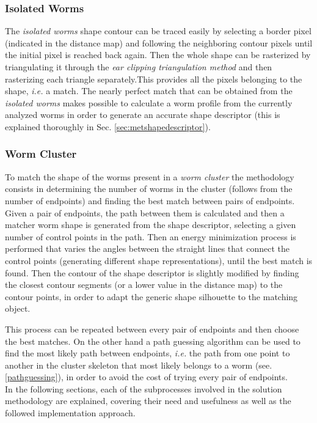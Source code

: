 \subsubsection*{Isolated Worms}
The \emph{isolated worms} shape contour can be traced easily by selecting a border pixel
(indicated in the distance map) and following the neighboring contour pixels until the
initial pixel is reached back again. Then the whole shape can be rasterized by 
triangulating it through the \emph{ear clipping triangulation method} and then rasterizing
each triangle separately.This provides all the pixels belonging to the shape, 
\emph{i.e.} a match.
The nearly perfect match that can be obtained from the \emph{isolated worms} makes 
possible to calculate a worm profile from the currently analyzed worms in order to
generate an accurate shape descriptor (this is explained thoroughly in 
Sec. \ref{sec:metshapedescriptor}).

\subsubsection*{Worm Cluster}
To match the shape of the worms present in a \emph{worm cluster} the methodology consists
in determining the number of worms in the cluster (follows from the number of
endpoints) and finding the best match between pairs of endpoints. Given a pair of 
endpoints, the path between them is calculated and then a matcher worm shape is generated
from the shape descriptor, selecting a given number of control points in the path.
Then an energy minimization process is performed that varies the angles between the 
straight lines that connect the control points (generating different shape representations),
until the best match is found. Then the contour of the shape descriptor is slightly 
modified by finding the closest contour segments (or a lower value in the distance map)
to the contour points, in order to adapt the generic shape silhouette to 
the matching object. 

This process can be repeated between every pair of endpoints and then choose the 
best matches. On the other hand a path guessing algorithm
can be used to find the most likely path between endpoints, \emph{i.e.} the path from
one point to another in the cluster skeleton that most likely belongs to a worm 
(see. \ref{pathguessing}), in order to avoid the cost of trying every pair of endpoints.\\

In the following sections, each of the subprocesses involved in the solution
methodology are explained, covering their need and usefulness as
well as the followed implementation approach.

